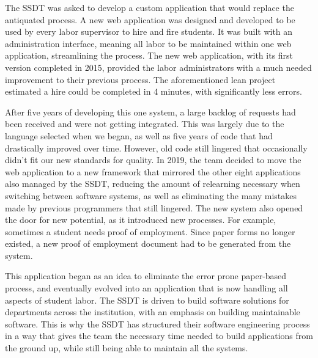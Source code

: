 The SSDT was asked to develop a custom application that would replace the antiquated process. A new web application was designed and developed to be used by every labor supervisor to hire and fire students. It was built with an administration interface, meaning all labor to be maintained within one web application, streamlining the process. The new web application, with its first version completed in 2015, provided the labor administrators with a much needed improvement to their previous process. The aforementioned lean project estimated a hire could be completed in 4 minutes, with significantly less errors.

After five years of developing this one system, a large backlog of requests had been received and were not getting integrated. This was largely due to the language selected when we began, as well as five years of code that had drastically improved over time. However, old code still lingered that occasionally didn't fit our new standards for quality. In 2019, the team decided to move the web application to a new framework that mirrored the other eight applications also managed by the SSDT, reducing the amount of relearning necessary when switching between software systems, as well as eliminating the many mistakes made by previous programmers that still lingered. The new system also opened the door for new potential, as it introduced new processes. For example, sometimes a student needs proof of employment. Since paper forms no longer existed, a new proof of employment document had to be generated from the system.

This application began as an idea to eliminate the error prone paper-based process, and eventually evolved into an application that is now handling all aspects of student labor. The SSDT is driven to build software solutions for departments across the institution, with an emphasis on building maintainable software. This is why the SSDT has structured their software engineering process in a way that gives the team the necessary time needed to build applications from the ground up, while still being able to maintain all the systems.
